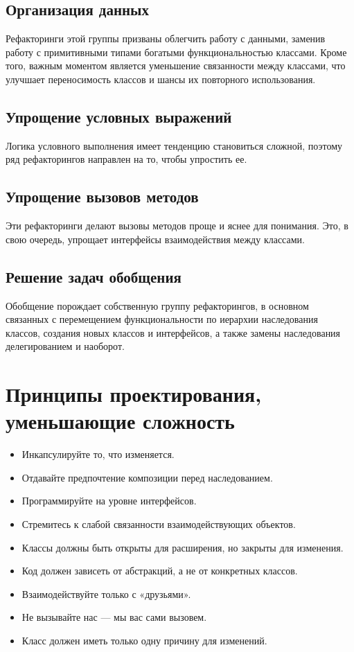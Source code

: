 \subsection{Организация данных}
Рефакторинги этой группы призваны облегчить работу с данными, заменив работу с примитивными типами богатыми функциональностью классами. Кроме того, важным моментом является уменьшение связанности между классами, что улучшает переносимость классов и шансы их повторного использования.

\newpage

\subsection{Упрощение условных выражений}
Логика условного выполнения имеет тенденцию становиться сложной, поэтому ряд рефакторингов направлен на то, чтобы упростить ее.

\subsection{Упрощение вызовов методов}
Эти рефакторинги делают вызовы методов проще и яснее для понимания. Это, в свою очередь, упрощает интерфейсы взаимодействия между классами.

\subsection{Решение задач обобщения}
Обобщение порождает собственную группу рефакторингов, в основном связанных с перемещением функциональности по иерархии наследования классов, создания новых классов и интерфейсов, а также замены наследования делегированием и наоборот.
\newpage

\section{Принципы проектирования, уменьшающие сложность}
\begin{itemize}
\item Инкапсулируйте то, что изменяется.
\item Отдавайте предпочтение композиции перед наследованием.
\item Программируйте на уровне интерфейсов.
\item Стремитесь к слабой связанности взаимодействующих объектов.
\item Классы должны быть открыты для расширения, но закрыты для изменения.
\item Код должен зависеть от абстракций, а не от конкретных классов.
\item Взаимодействуйте только с «друзьями».
\item Не вызывайте нас — мы вас сами вызовем.
\item Класс должен иметь только одну причину для изменений.
\end{itemize}
\newpage


